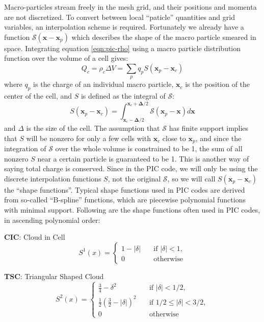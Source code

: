 Macro-particles stream freely in the mesh grid, and their positions and momenta
are not discretized. To convert between local ``paticle'' quantities and grid
variables, an interpolation scheme is required. Fortunately we already have a
function $\mathcal{S}(\mathbf{x} - \mathbf{x}_p)$ which describes the shape of the macro
particle smeared in space. Integrating equation \eqref{eqn:pic-rho} using a
macro particle distribution function over the volume of a cell gives:
\begin{equation}
  \label{eqn:rho-cell}
  Q_{c} = \rho_{c}\Delta V = \sum_pq_pS(\mathbf{x}_p-\mathbf{x}_{c})
\end{equation}
where $q_p$ is the charge of an individual macro particle, $\mathbf{x}_{c}$ is
the position of the center of the cell, and $S$ is defined as
the integral of $\mathcal{S}$:
\begin{equation}
  \label{eqn:weight-function}
  S(\mathbf{x}_p - \mathbf{x}_c) = \int_{\mathbf{x}_c - \mathbf{\Delta}/2}^{\mathbf{x}_c + \mathbf{\Delta}/2} \mathcal{S}(\mathbf{x}_p - \mathbf{x})d\mathbf{x}
\end{equation}
and $\Delta$ is the size of the cell. The assumption that $\mathcal{S}$ has
finite support implies that $S$ will be nonzero for only a few cells with
$\mathbf{x}_{c}$ close to $\mathbf{x}_{p}$, and since the integration of
$\mathcal{S}$ over the whole volume is constrained to be 1, the sum of all
nonzero $S$ near a certain particle is guaranteed to be 1. This is another way
of saying total charge is conserved. Since in the PIC code, we will only be
using the discrete interpolation functions $S$, not the original $\mathcal{S}$,
so we will call $S(\mathbf{x}_p - \mathbf{x}_c)$ the ``shape functions''.
Typical shape functions used in PIC codes are derived from so-called
``B-spline'' functions, which are piecewise polynomial functions with minimal
support. Following are the shape functions often used in PIC codes, in ascending
polynomial order:

\textbf{CIC}: Cloud in Cell
\begin{equation}
  \label{eq:first-order-deposit}
  S^1(x) = \begin{cases}
    \displaystyle 1 - |\delta| & \quad \text{if } |\delta| < 1, \\
    \displaystyle 0            & \quad \text{otherwise}
  \end{cases}
\end{equation}

\textbf{TSC}: Triangular Shaped Cloud
\begin{equation}
  \label{eq:second-order-deposit}
  S^2(x) =
  \begin{cases}
    \displaystyle \frac{3}{4} - \delta^2 & \quad \text{if } |\delta| < 1/2, \\
    \displaystyle \frac{1}{2} \left( \frac{3}{2} - |\delta| \right)^2 & \quad \text{if } 1/2 \leq |\delta| < 3/2, \\
    \displaystyle 0                      & \quad \text{otherwise}
  \end{cases}
\end{equation}

